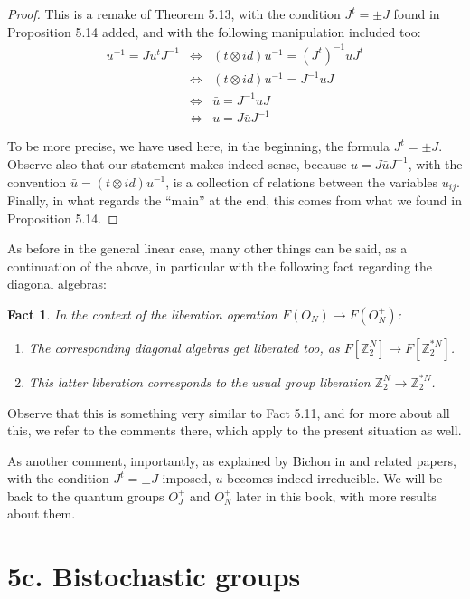 \documentclass[12pt]{amsbook}
\newtheorem{fact}[theorem]{Fact}
\begin{document}
\begin{proof}
This is a remake of Theorem 5.13, with the condition $J^t=\pm J$ found in Proposition 5.14 added, and with the following manipulation included too:
\begin{eqnarray*}
u^{-1}=Ju^tJ^{-1}
&\iff&(t\otimes id)u^{-1}=(J^t)^{-1}uJ^t\\
&\iff&(t\otimes id)u^{-1}=J^{-1}uJ\\
&\iff&\bar{u}=J^{-1}uJ\\
&\iff&u=J\bar{u}J^{-1}
\end{eqnarray*}

To be more precise, we have used here, in the beginning, the formula $J^t=\pm J$. Observe also that our statement makes indeed sense, because $u=J\bar{u}J^{-1}$, with the convention $\bar{u}=(t\otimes id)u^{-1}$, is a collection of relations between the variables $u_{ij}$. Finally, in what regards the ``main'' at the end, this comes from what we found in Proposition 5.14.
\end{proof}

As before in the general linear case, many other things can be said, as a continuation of the above, in particular with the following fact regarding the diagonal algebras:

\begin{fact}
In the context of the liberation operation $F(O_N)\to F(O_N^+)$:
\begin{enumerate}
\item The corresponding diagonal algebras get liberated too, as $F[\mathbb Z_2^N]\to F[\mathbb Z_2^{*N}]$.

\item This latter liberation corresponds to the usual group liberation $\mathbb Z_2^N\to\mathbb Z_2^{*N}$.
\end{enumerate}
\end{fact} 

Observe that this is something very similar to Fact 5.11, and for more about all this, we refer to the comments there, which apply to the present situation as well.

\bigskip

As another comment, importantly, as explained by Bichon in \cite{bi3} and related papers, with the condition $J^t=\pm J$ imposed, $u$ becomes indeed irreducible. We will be back to the quantum groups $O_J^+$ and $O_N^+$ later in this book, with more results about them.

\section*{5c. Bistochastic groups} 
\end{document}
